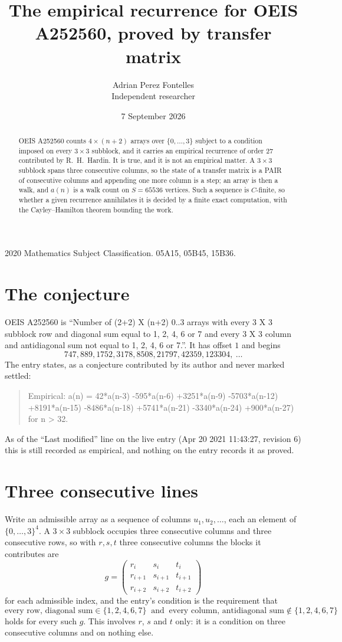 \documentclass[11pt,a4paper]{article}
\title{The empirical recurrence for OEIS A252560, proved by transfer matrix}
\author{Adrian Perez Fontelles\\ \small Independent researcher}
\date{7 September 2026}
\theoremstyle{plain}
\theoremstyle{definition}
\begin{document}
\maketitle

\begin{abstract}
OEIS A252560 counts $4\times(n+2)$ arrays over $\{0,\dots,3\}$ subject to a condition imposed on
every $3\times3$ subblock, and it carries an empirical recurrence of order $27$
contributed by R.~H.~Hardin. It is true, and it is not an empirical matter. A $3\times3$
subblock spans three consecutive columns, so the state of a transfer matrix is a PAIR of
consecutive columns and appending one more column is a step; an array is then a walk, and
$a(n)$ is a walk count on $S=65536$ vertices. Such a sequence is $C$-finite, so whether a given
recurrence annihilates it is decided by a finite exact computation, with the Cayley--Hamilton
theorem bounding the work.
\end{abstract}

\noindent\small 2020 Mathematics Subject Classification. 05A15, 05B45, 15B36.\normalsize

\section{The conjecture}

OEIS A252560 is ``Number of (2+2) X (n+2) 0..3 arrays with every 3 X 3 subblock row and diagonal sum equal to 1, 2, 4, 6 or 7 and every 3 X 3 column and antidiagonal sum not equal to 1, 2, 4, 6 or 7.''. It has offset $1$ and begins
\[
747, 889, 1752, 3178, 8508, 21797, 42359, 123304,\ \dots
\]
The entry states, as a conjecture contributed by its author and never marked settled:
\begin{quote}
Empirical: a(n) = 42*a(n-3) -595*a(n-6) +3251*a(n-9) -5703*a(n-12) +8191*a(n-15) -8486*a(n-18) +5741*a(n-21) -3340*a(n-24) +900*a(n-27) for n > 32.
\end{quote}
As of the ``Last modified'' line on the live entry (Apr 20 2021 11:43:27, revision 6) this is still
recorded as empirical, and nothing on the entry records it as proved.

\section{Three consecutive lines}

Write an admissible array as a sequence of columns $u_1,u_2,\dots$, each an element of
$\{0,\dots,3\}^{4}$. A $3\times3$ subblock occupies three consecutive columns and
three consecutive rows, so with $r,s,t$ three consecutive columns the blocks it
contributes are
\[
g=\begin{pmatrix}r_i&s_i&t_i\\ r_{i+1}&s_{i+1}&t_{i+1}\\ r_{i+2}&s_{i+2}&t_{i+2}\end{pmatrix}
\]
for each admissible index, and the entry's condition is the requirement that
\[
\text{every row, diagonal sum} \in \{1,2,4,6,7\}\ \text{ and }\ \text{every column, antidiagonal sum} \notin \{1,2,4,6,7\}
\]
holds for every such $g$. This involves $r$, $s$ and $t$ only: it is a condition on
three consecutive columns and on nothing else.
\end{document}
